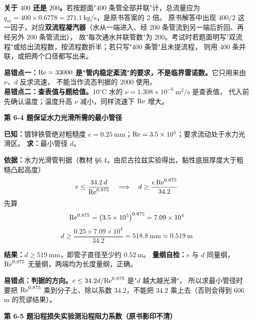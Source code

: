 \begin{tishi}
\textbf{关于 $400$ 还是 $200$。}若按题面"400 条管全部并联"计，总流量应为
$q_m=400\times0.6778=271.1\ \mathrm{kg/s}$，是原书答案的 2 倍。
原书解答中出现 $400/2$ 这一因子，对应\textbf{双流程凝汽器}（水从一端进入、经 200 条管流到另一端后折回、再经另外 200 条管流出），
故"每次通水并联管数"为 200。考试时若题面明写"双流程"或给出流程数，按流程数折半；若只写"400 条管"且未提流程，
则用 400 条并联，或把两个口径都写出来。
\end{tishi}

\begin{yicuo}
\textbf{易错点一：$\mathrm{Re}=33000$ 是"管内稳定紊流"的要求，不是临界雷诺数。}它只用来由 $\nu$、$d$ 反求流速，
不能当作流态判据的 $2000$ 使用。\\
\textbf{易错点二：查表值与题给值。}10$^\circ$C 水的 $\nu=1.308\times10^{-6}\ \mathrm{m^2/s}$ 是查表值，
代入前先确认温度；温度升高 $\nu$ 减小，同样流速下 $\mathrm{Re}$ 增大。
\end{yicuo}

\noindent\textbf{第 6-4 题\quad 保证水力光滑所需的最小管径}

\begin{jie}
\textbf{已知：}镀锌铁管绝对粗糙度 $e=0.25\ \mathrm{mm}$；$\mathrm{Re}=3.5\times10^5$；要求流动处于水力光滑区。
\textbf{求：}最小管径 $d$。

\textbf{依据：}水力光滑管判据（教材 \S 6.4，由尼古拉兹实验得出，黏性底层厚度大于粗糙凸起高度）
\[ e\le\frac{34.2\,d}{\mathrm{Re}^{0.875}}\quad\Longrightarrow\quad d\ge\frac{e\,\mathrm{Re}^{0.875}}{34.2} \]
先算
\[ \mathrm{Re}^{0.875}=\left(3.5\times10^5\right)^{0.875}=7.09\times10^4 \]
\[ d\ge\frac{0.25\times7.09\times10^4}{34.2}=518.8\ \mathrm{mm}\approx0.519\ \mathrm{m} \]

\textbf{结果：}$d\ge519\ \mathrm{mm}$，即管子直径至少约 $0.52\ \mathrm{m}$。
\textbf{量纲自检：}$e$ 与 $d$ 同量纲，$\mathrm{Re}^{0.875}$ 无量纲，两端均为长度量纲，正确。
\end{jie}

\begin{yicuo}
\textbf{易错点：判据的方向。}$e\le34.2d/\mathrm{Re}^{0.875}$ 是"$d$ 越大越光滑"，
所以求最小管径时要把 $\mathrm{Re}^{0.875}$ 乘到分子上、除以系数 $34.2$，不能把 $34.2$ 乘上去（否则会得到 606 m 的荒谬结果）。
\end{yicuo}

\noindent\textbf{第 6-5 题\quad 沿程损失实验测沿程阻力系数（原书影印不清）}


